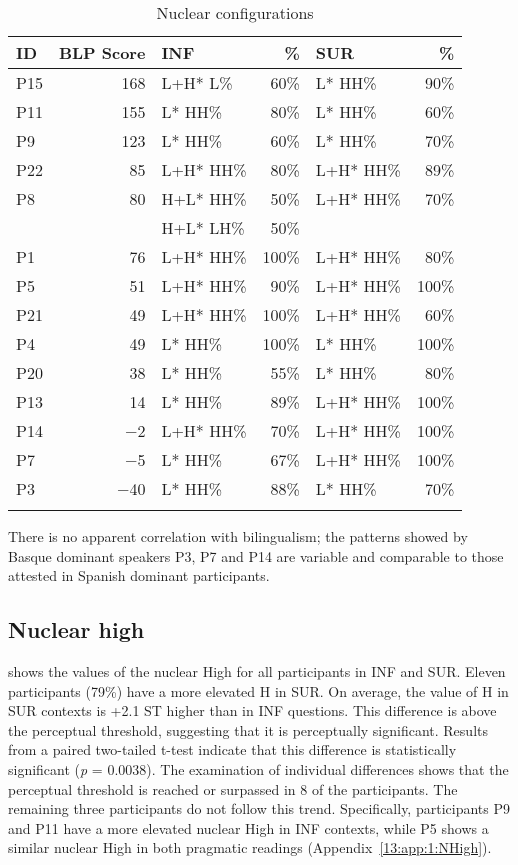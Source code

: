 \documentclass[output=paper,colorlinks,citecolor=brown,draftmode]{langscibook}
\begin{document}
\begin{table}
\caption{Nuclear configurations}
\label{13:table2}
 \begin{tabular}{lrlrlr}
  \lsptoprule
ID & BLP Score & INF       & \%    & SUR       & \%    \\
  \midrule
P15         & 168       & L+H* L\%  & 60\%  & L* HH\%   & 90\%  \\
P11         & 155       & L* HH\%   & 80\%  & L* HH\%   & 60\%  \\
P9          & 123       & L* HH\%   & 60\%  & L* HH\%   & 70\%  \\
P22         & 85        & L+H* HH\% & 80\%  & L+H* HH\% & 89\%  \\
P8          & 80        & H+L* HH\% & 50\%  & L+H* HH\% & 70\%  \\
            &           & H+L* LH\% & 50\%  &           &       \\
P1          & 76        & L+H* HH\% & 100\% & L+H* HH\% & 80\%  \\
P5          & 51        & L+H* HH\% & 90\%  & L+H* HH\% & 100\% \\
P21         & 49        & L+H* HH\% & 100\% & L+H* HH\% & 60\%  \\
P4          & 49        & L* HH\%   & 100\% & L* HH\%   & 100\% \\
P20         & 38        & L* HH\%   & 55\%  & L* HH\%   & 80\%  \\
P13         & 14        & L* HH\%   & 89\%  & L+H* HH\% & 100\% \\
P14         & $-$2        & L+H* HH\% & 70\%  & L+H* HH\% & 100\% \\
P7          & $-$5        & L* HH\%   & 67\%  & L+H* HH\% & 100\% \\
P3          & $-$40       & L* HH\%   & 88\%  & L* HH\%   & 70\%\\
  \lspbottomrule
 \end{tabular}
\end{table}

There is no apparent correlation with bilingualism; the patterns showed by Basque dominant speakers P3, P7 and P14 are variable and comparable to those attested in Spanish dominant participants.

\subsection{Nuclear high}
 shows the values of the nuclear High for all participants in INF and SUR. Eleven participants (79\%) have a more elevated H in SUR. On average, the value of H in SUR contexts is +2.1 ST higher than in INF questions. This difference is above the perceptual threshold, suggesting that it is perceptually significant. Results from a paired two-tailed t-test indicate that this difference is statistically significant (\textit{p} = 0.0038). The examination of individual differences shows that the perceptual threshold is reached or surpassed in 8 of the participants. The remaining three participants do not follow this trend. Specifically, participants P9 and P11 have a more elevated nuclear High in INF contexts, while P5 shows a similar nuclear High in both pragmatic readings (Appendix~\ref{13:app:1:NHigh}).\\
\end{document}
